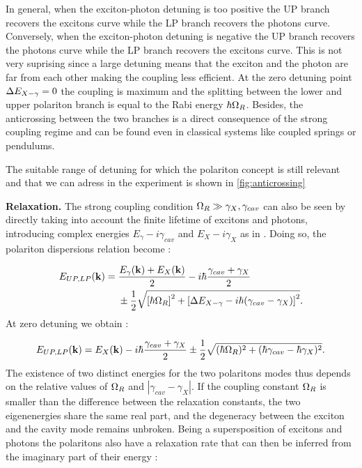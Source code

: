 In general, when the exciton-photon detuning is too positive the UP branch recovers the excitons curve while the LP branch recovers the photons curve. Conversely,
when the exciton-photon detuning is negative the UP branch recovers the photons curve while the LP branch recovers the excitons curve. This is not very suprising
since a large detuning means that the exciton and the photon are far from each other making the coupling less efficient.  At the zero detuning point 
$\Delta E_{X-\gamma}=0$ the coupling is maximum and the splitting between the lower and upper polariton branch is equal to the Rabi energy $\hbar\Omega_R$. Besides, the anticrossing
between the two branches is a direct consequence of the strong coupling regime and can be found even in classical systems like coupled springs or pendulums. 

The suitable range of detuning for which the polariton concept is still relevant and that we can adress in the experiment is shown in \autoref{fig:anticrossing}
\bigskip

\textbf{Relaxation.} The strong coupling condition $\Omega_R \gg \gamma_X, \gamma_{cav}$ can also be seen by directly taking into account
the finite lifetime of excitons and photons, introducing complex energies $E_{\gamma}-i \gamma_{cav}$ and $E_X-i\gamma_X$ as in \cite{cohen-tannoudji_photons_2004}.
Doing so, the polariton dispersions relation become :

\begin{align}
    \begin{split}
        E_{UP, LP}(\mathbf{k}) ={}& \dfrac{E_{\gamma}(\mathbf{k}) + E_{X}(\mathbf{k})}{2} - i \hbar \dfrac{\gamma_{cav} + \gamma_X}{2}
        \\& \pm \dfrac{1}{2} \sqrt{\left[ \hbar \Omega_R \right]^2 + \left[ \Delta E_{X-\gamma} - i \hbar (\gamma_{cav} -  \gamma_X )\right]^2}.
    \end{split}
    \label{polariton_disp_loss}
    \end{align}
At zero detuning we obtain :

\begin{equation}
        E_{UP, LP}(\mathbf{k}) =E_{X}(\mathbf{k}) - i \hbar \dfrac{\gamma_{cav} + \gamma_X}{2} \pm \dfrac{1}{2} \sqrt{(\hbar \Omega_R) ^2 +  (\hbar\gamma_{cav} - \hbar \gamma_X )^2}.
    \label{polariton_disp_loss_zero_det}
\end{equation}
The existence of two distinct energies for the two polaritons modes thus depends on the relative values of $\Omega_R$ and $|\gamma_{cav} - \gamma_X|$.
 If the coupling constant $\Omega_R$ is smaller than the difference between the relaxation constants, the two eigenenergies share the same real part, and the degeneracy between the exciton and the cavity mode remains unbroken.
Being a supersposition of excitons and photons the polaritons also have a relaxation rate that can then be inferred from the imaginary part of their energy :

